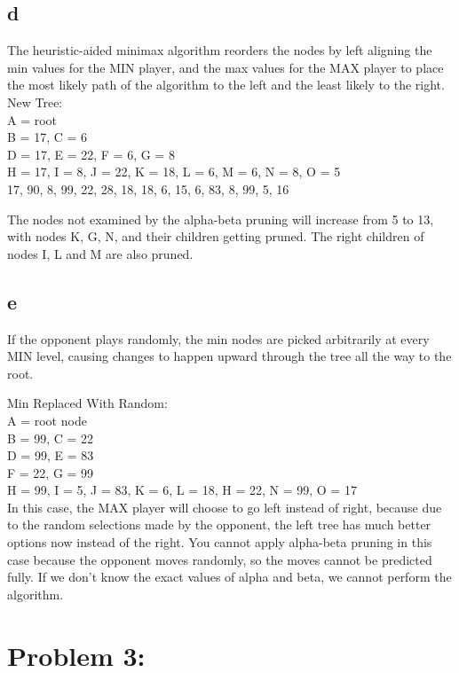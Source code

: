 \documentclass[11pt, oneside]{article}   	%
\begin{document}
\begin{flushleft}
\subsection*{d}
The heuristic-aided minimax algorithm reorders the nodes by left aligning the min values for the MIN player, and the max values for the MAX player to place the most likely path of the algorithm to the left and the least likely to the right.\\
New Tree: \\
A = root\\
B = 17, C = 6\\
D = 17, E = 22, F = 6, G = 8\\
H = 17, I = 8, J = 22, K = 18, L = 6, M = 6, N = 8, O = 5\\
17, 90, 8, 99, 22, 28, 18, 18, 6, 15, 6, 83, 8, 99, 5, 16 \\\medskip

The nodes not examined by the alpha-beta pruning will increase from 5 to 13, with nodes K, G, N, and their children getting pruned. The right children of nodes I, L and M are also pruned.\\\medskip

\subsection*{e} 
If the opponent plays randomly, the min nodes are picked arbitrarily at every MIN level, causing changes to happen upward through the tree all the way to the root. \\\medskip

Min Replaced With Random:\\
A = root node\\
B = 99, C = 22\\
D = 99, E = 83 \\
F = 22, G = 99 \\
H = 99, I = 5, J = 83, K = 6, L = 18, H = 22, N = 99, O = 17 \\\medskip
In this case, the MAX player will choose to go left instead of right, because due to the random selections made by the opponent, the left tree has much better options now instead of the right. You cannot apply alpha-beta pruning in this case because the opponent moves randomly, so the moves cannot be predicted fully. If we don't know the exact values of alpha and beta, we cannot perform the algorithm.\\\medskip

\section*{Problem 3:}

\end{flushleft}
\end{document}
